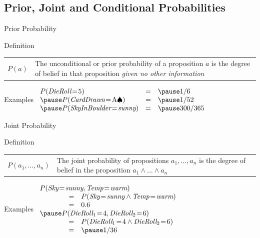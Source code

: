 \documentclass[12pt]{beamer}
\newcommand{\EM}[1]{\mbox{\em#1}}
\begin{document}
\subsection{Prior, Joint and Conditional Probabilities}
\begin{frame}{Prior Probability}
	\begin{block}{Definition}
		\begin{tabular}{lm{3.5in}}
			\large $P(a)$
			&
			The \alert{unconditional} or \alert{prior probability} of a proposition $a$ is the degree of belief in that proposition \emph{given no other information}
		\end{tabular}
	\end{block}
	\pause
	\begin{block}{Examples}
		$
		\begin{array}{lll}
			P(\EM{DieRoll} \!=\! 5)                    & = & \pause 1/6 \\
			\pause
			P(\EM{CardDrawn} \!=\! \mbox{A}\spadesuit) & = & \pause 1/52 \\
			\pause
			P(\EM{SkyInBoulder} \!=\! \EM{sunny})      & = & \pause 300/365
		\end{array}
		$
	\end{block}
\end{frame}
\begin{frame}{Joint Probability}
	\begin{block}{Definition}
		\begin{tabular}{lm{2.75in}}
			\large $P(a_1, \ldots, a_n)$
			&
			The \alert{joint probability} of propositions $a_1, \ldots, a_n$ is the degree of belief in the proposition $a_1 \land \ldots \land a_n$
		\end{tabular}
	\end{block}
	\pause
	\begin{block}{Examples}
		$
		\begin{array}{lll}
			\lefteqn{P(\EM{Sky} \!=\! \EM{sunny}, \EM{Temp} \!=\! \EM{warm})} \\
			& = & P(\EM{Sky} \!=\! \EM{sunny} \land \EM{Temp} \!=\! \EM{warm}) \\
			& = & 0.6 \\
			\pause
			\lefteqn{P(\EM{DieRoll}_1 \!=\! 4, \EM{DieRoll}_2 \!=\! 6)} \\
			& = & P(\EM{DieRoll}_1 \!=\! 4 \land \EM{DieRoll}_2 \!=\! 6) \\
			& = & \pause 1/36 \\
		\end{array}
		$
	\end{block}
\end{frame}
\end{document}

